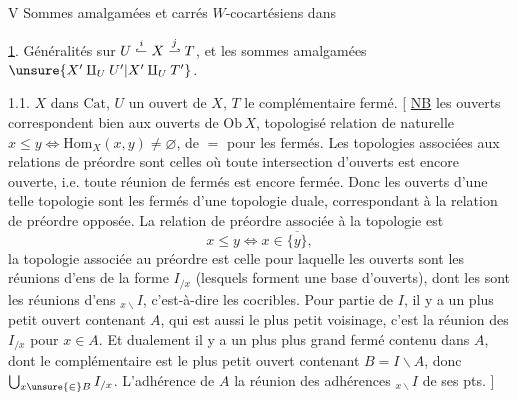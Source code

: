 V Sommes amalgamées et carrés $W$-cocartésiens dans 

\uline{1}. Généralités sur $U\overset{i}{\lhook\joinrel\relbar}X\overset{j}{\relbar\joinrel\rhook}T$, et les sommes amalgamées $\unsure{X'\amalg_U U'|X'\amalg_U T'}$.

1.1.   $X$ dans $\mathrm{Cat}$, $U$ un ouvert de $X$, $T$ le complémentaire fermé.
[ \uline{NB} les ouverts correspondent bien aux ouverts de $\mathrm{Ob}\,X$, topologisé   relation de   naturelle $x\leq y\Longleftrightarrow\mathrm{Hom}_X(x,y)\ne\varnothing$, de $=$ pour les fermés.
Les topologies associées aux relations de préordre sont celles où toute intersection d'ouverts est encore ouverte, i.e. toute réunion de fermés est encore fermée. Donc les ouverts d'une telle topologie sont les fermés d'une topologie duale, correspondant à la relation de préordre opposée. La relation de préordre associée à la topologie est
\[
x\leq y\Longleftrightarrow x\in\overline{\{y\}},
\]
la topologie associée au préordre  est celle pour laquelle les ouverts sont les réunions d'ens de la forme $I_{/x}$ (lesquels forment une base d'ouverts),  dont les  sont les réunions d'ens $ {}_{x\backslash}I$, c'est-à-dire les cocribles.
Pour  partie   de $I$, il y a un plus petit ouvert contenant $A$, qui est aussi le plus petit voisinage, c'est la réunion des  $I_{/x}$ pour $x\in A$. Et dualement il y a un plus plus grand fermé contenu dans $A$, dont le complémentaire est le plus petit ouvert contenant $B=I\backslash A$, donc $\bigcup_{x\unsure{\in} B}I_{/x}$. L'adhérence de $A$  la réunion des adhérences  $ {}_{x\backslash}I$ de ses pts. ]
